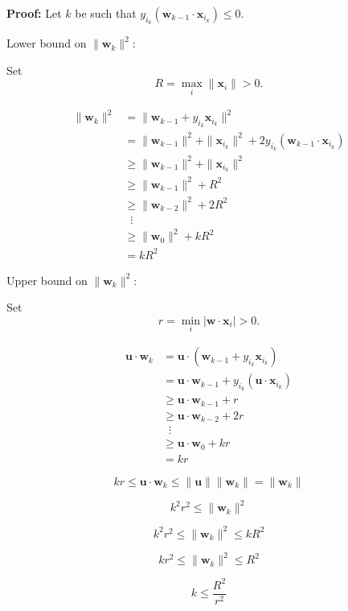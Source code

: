 \documentclass{beamer}
\newcommand{\vu}{\boldsymbol{u}}
\newcommand{\vw}{\boldsymbol{w}}
\newcommand{\vx}{\boldsymbol{x}}
\begin{document}
\begin{frame}{}
    \textbf{Proof:} Let $k$ be such that $y_{i_k}(\vw_{k-1}\cdot\vx_{i_k})\leq 0$.

    Lower bound on $\|\vw_k\|^2$:

    Set
    \[
        R = \max_i\|\vx_i\|>0.
    \]

    \vspace{-2em}\begin{align*}
        \|\vw_k\|^2 &= \|\vw_{k-1} + y_{i_k}\vx_{i_k}\|^2\\
        &= \|\vw_{k-1}\|^2 + \|\vx_{i_k}\|^2 + 2y_{i_k}(\vw_{k-1}\cdot\vx_{i_k})\\
        &\geq \|\vw_{k-1}\|^2 + \|\vx_{i_k}\|^2\\
        &\geq \|\vw_{k-1}\|^2 + R^2\\
        &\geq \|\vw_{k-2}\|^2 + 2R^2\\
        &\;\;\vdots\\
        &\geq \|\vw_0\|^2 + kR^2\\
        &= kR^2
    \end{align*}
\end{frame}

\begin{frame}{}
    Upper bound on $\|\vw_k\|^2$:
 
    Set
    \[
        r = \min_i |\vw\cdot \vx_i|>0.
    \]

    \vspace{-2em}\begin{align*}
        \vu\cdot \vw_k &= \vu\cdot(\vw_{k-1} + y_{i_k}\vx_{i_k})\\
        &= \vu\cdot \vw_{k-1} + y_{i_k}(\vu\cdot \vx_{i_k})\\
        &\geq \vu\cdot \vw_{k-1} + r\\
        &\geq \vu\cdot \vw_{k-2} + 2r\\
        &\;\;\vdots\\
        &\geq \vu\cdot\vw_0 + kr\\
        &= kr
    \end{align*}

    \vspace{-2em}\[
        kr\leq \vu\cdot\vw_k\leq \|\vu\|\|\vw_k\| = \|\vw_k\|
    \]

    \vspace{-2em}\[
        k^2r^2\leq \|\vw_k\|^2
    \]
\end{frame}

\begin{frame}{}
    \[
        k^2r^2\leq \|\vw_k\|^2\leq kR^2
    \]

    \[
        kr^2\leq \|\vw_k\|^2\leq R^2
    \]

    \[
        k\leq \frac{R^2}{r^2}
    \]
\end{frame}
\end{document}

